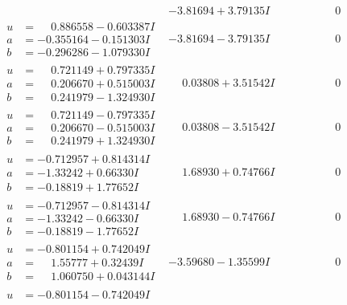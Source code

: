 \documentclass[1p]{elsarticle_modified}
\theoremstyle{definition}
\begin{document}
$$\begin{array}{c|c|c}
 & -3.81694 + 3.79135 I & \phantom{-0.000000 } 0 \\ \hline\begin{aligned}
u &= \phantom{-}0.886558 - 0.603387 I \\
a &= -0.355164 - 0.151303 I \\
b &= -0.296286 - 1.079330 I\end{aligned}
 & -3.81694 - 3.79135 I & \phantom{-0.000000 } 0 \\ \hline\begin{aligned}
u &= \phantom{-}0.721149 + 0.797335 I \\
a &= \phantom{-}0.206670 + 0.515003 I \\
b &= \phantom{-}0.241979 - 1.324930 I\end{aligned}
 & \phantom{-}0.03808 + 3.51542 I & \phantom{-0.000000 } 0 \\ \hline\begin{aligned}
u &= \phantom{-}0.721149 - 0.797335 I \\
a &= \phantom{-}0.206670 - 0.515003 I \\
b &= \phantom{-}0.241979 + 1.324930 I\end{aligned}
 & \phantom{-}0.03808 - 3.51542 I & \phantom{-0.000000 } 0 \\ \hline\begin{aligned}
u &= -0.712957 + 0.814314 I \\
a &= -1.33242 + 0.66330 I \\
b &= -0.18819 + 1.77652 I\end{aligned}
 & \phantom{-}1.68930 + 0.74766 I & \phantom{-0.000000 } 0 \\ \hline\begin{aligned}
u &= -0.712957 - 0.814314 I \\
a &= -1.33242 - 0.66330 I \\
b &= -0.18819 - 1.77652 I\end{aligned}
 & \phantom{-}1.68930 - 0.74766 I & \phantom{-0.000000 } 0 \\ \hline\begin{aligned}
u &= -0.801154 + 0.742049 I \\
a &= \phantom{-}1.55777 + 0.32439 I \\
b &= \phantom{-}1.060750 + 0.043144 I\end{aligned}
 & -3.59680 - 1.35599 I & \phantom{-0.000000 } 0 \\ \hline\begin{aligned}
u &= -0.801154 - 0.742049 I \\

\end{aligned}
\end{array}$$
\end{document}
